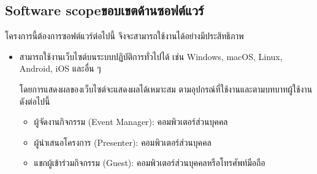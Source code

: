 \subsection{\ifenglish Software scope\else ขอบเขตด้านซอฟต์แวร์\fi}
โครงการนี้ต้องการซอฟต์แวร์ต่อไปนี้ จึงจะสามารถใช้งานได้อย่างมีประสิทธิภาพ
\begin{itemize}
    \item สามารถใช้งานเว็บไซต์บนระบบปฏิบัติการทั่วไปได้ เช่น Windows, macOS, Linux, Android, iOS และอื่น ๆ

          โดยการแสดงผลของเว็บไซต์จะแสดงผลได้เหมาะสม ตามอุปกรณ์ที่ใช้งานและตามบทบาทผู้ใช้งานดังต่อไปนี้
          \begin{itemize}
              \item ผู้จัดงานกิจกรรม (Event Manager):
                    คอมพิวเตอร์ส่วนบุคคล
              \item ผู้นำเสนอโครงการ (Presenter):
                    คอมพิวเตอร์ส่วนบุคคล
              \item แขกผู้เข้าร่วมกิจกรรม (Guest):
                    คอมพิวเตอร์ส่วนบุคคลหรือโทรศัพท์มือถือ
          \end{itemize}
\end{itemize}

